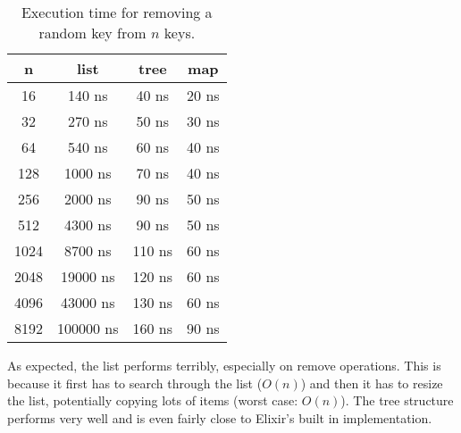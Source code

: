 \documentclass[a4paper,11pt]{article}
\begin{document}
\begin{table}[H]
\centering
\begin{tabular}{|c|c|c|c|}
\hline
\textbf{n} & \textbf{list} & \textbf{tree} & \textbf{map} \\
\hline
  16 & 140 ns & 40 ns & 20 ns \\
  32 & 270 ns & 50 ns & 30 ns \\
  64 & 540 ns & 60 ns & 40 ns \\
  128 & 1000 ns & 70 ns & 40 ns \\
  256 & 2000 ns & 90 ns & 50 ns \\
  512 & 4300 ns & 90 ns & 50 ns \\
  1024 & 8700 ns & 110 ns & 60 ns \\
  2048 & 19000 ns & 120 ns & 60 ns \\
  4096 & 43000 ns & 130 ns & 60 ns \\
  8192 & 100000 ns & 160 ns & 90 ns \\
\hline
\end{tabular}
\caption{Execution time for removing a random key from $n$ keys.}
\label{tab:table3}
\end{table}

As expected, the list performs terribly, especially on remove operations.
This is because it first has to search through the list ($O(n)$)
and then it has to resize the list, potentially copying lots of items (worst case: $O(n)$).
The tree structure performs very well and is even fairly close to Elixir's built in implementation.
\end{document}
